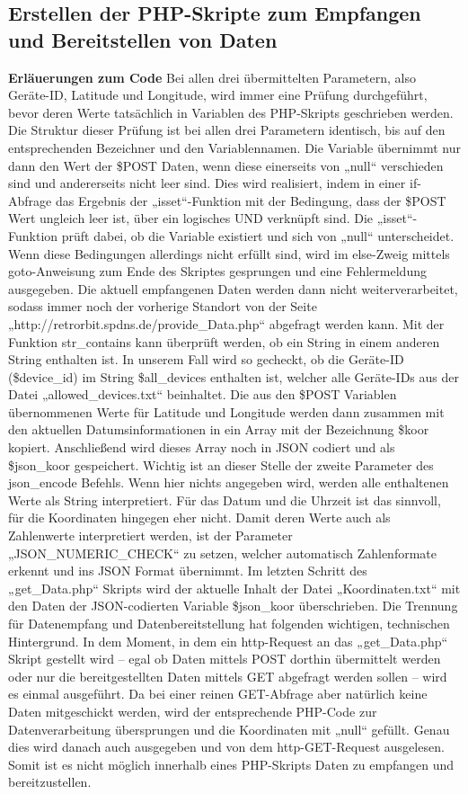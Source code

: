 \subsection{Erstellen der PHP-Skripte zum Empfangen und Bereitstellen von Daten}
\textbf{Erläuerungen zum Code }Bei allen drei übermittelten Parametern, also Geräte-ID, Latitude und Longitude, wird immer eine Prüfung durchgeführt, bevor deren Werte tatsächlich in Variablen des PHP-Skripts geschrieben werden. Die Struktur dieser Prüfung ist bei allen drei Parametern identisch, bis auf den entsprechenden Bezeichner und den Variablennamen.
Die Variable übernimmt nur dann den Wert der \$POST Daten, wenn diese einerseits von „null“ verschieden sind und andererseits nicht leer sind. Dies wird realisiert, indem in einer if-Abfrage das Ergebnis der „isset“-Funktion mit der Bedingung, dass der \$POST Wert ungleich leer ist, über ein logisches UND verknüpft sind. Die „isset“-Funktion prüft dabei, ob die Variable existiert und sich von „null“ unterscheidet. Wenn diese Bedingungen allerdings nicht erfüllt sind, wird im else-Zweig mittels goto-Anweisung zum Ende des Skriptes gesprungen und eine Fehlermeldung ausgegeben. Die aktuell empfangenen Daten werden dann nicht weiterverarbeitet, sodass immer noch der vorherige Standort von der Seite „http://retrorbit.spdns.de/provide\_Data.php“ abgefragt werden kann.
Mit der Funktion str\_contains kann überprüft werden, ob ein String in einem anderen String enthalten ist. In unserem Fall wird so gecheckt, ob die Geräte-ID (\$device\_id) im String \$all\_devices enthalten ist, welcher alle Geräte-IDs aus der Datei „allowed\_devices.txt“ beinhaltet.
Die aus den \$POST Variablen übernommenen Werte für Latitude und Longitude werden dann zusammen mit den aktuellen Datumsinformationen in ein Array mit der Bezeichnung \$koor kopiert. Anschließend wird dieses Array noch in JSON codiert und als \$json\_koor gespeichert. Wichtig ist an dieser Stelle der zweite Parameter des json\_encode Befehls. Wenn hier nichts angegeben wird, werden alle enthaltenen Werte als String interpretiert. Für das Datum und die Uhrzeit ist das sinnvoll, für die Koordinaten hingegen eher nicht. Damit deren Werte auch als Zahlenwerte interpretiert werden, ist der Parameter „JSON\_NUMERIC\_CHECK“ zu setzen, welcher automatisch Zahlenformate erkennt und ins JSON Format übernimmt. Im letzten Schritt des „get\_Data.php“ Skripts wird der aktuelle Inhalt der Datei „Koordinaten.txt“ mit den Daten der JSON-codierten Variable \$json\_koor überschrieben.
Die Trennung für Datenempfang und Datenbereitstellung hat folgenden wichtigen, technischen Hintergrund. In dem Moment, in dem ein http-Request an das „get\_Data.php“ Skript gestellt wird – egal ob Daten mittels POST dorthin übermittelt werden oder nur die bereitgestellten Daten mittels GET abgefragt werden sollen – wird es einmal ausgeführt. Da bei einer reinen GET-Abfrage aber natürlich keine Daten mitgeschickt werden, wird der entsprechende PHP-Code zur Datenverarbeitung übersprungen und die Koordinaten mit „null“ gefüllt. Genau dies wird danach auch ausgegeben und von dem http-GET-Request ausgelesen. Somit ist es nicht möglich innerhalb eines PHP-Skripts Daten zu empfangen und bereitzustellen.
